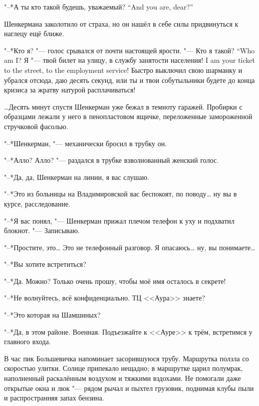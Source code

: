 {"--*А ты кто такой будешь, уважаемый?}
{``And you are, dear?''}

Шенкермана заколотило от страха, но он нашёл в себе силы придвинуться к наглецу ещё ближе.

"--*Кто я? "--- голос срывался от почти настоящей ярости.
{"--- Кто я такой?}
{``Who am I?}
{Я "--- твой билет на улицу, в службу занятости населения!}
{I am your ticket to the street, to the employment service!}
Быстро выключил свою шарманку и убрался отсюда, даю десять секунд, или ты и твои собутыльники будете до конца кризиса за жратву натурой расплачиваться!

\ldots{}Десять минут спустя Шенкерман уже бежал в темноту гаражей.
Пробирки с образцами лежали у него в пенопластовом ящичке, переложенные замороженной стручковой фасолью.

\asterism

\textspace

\label{Wed_2012_08_29}

"--*Шенкерман, "--- механически бросил в трубку он.

"--*Алло? Алло? "--- раздался в трубке взволнованный женский голос.

"--*Да, да, Шенкерман на линии, я вас слушаю.

"--*Это из больницы на Владимировской вас беспокоят, по поводу\ldots{} ну вы в курсе, расследование.

"--*Я вас понял, "--- Шенкерман прижал плечом телефон к уху и подхватил блокнот.
"--- Записываю.

"--*Простите, это\ldots{}
Это не телефонный разговор.
Я опасаюсь\ldots{} ну, вы понимаете\ldots{}

"--*Вы хотите встретиться?

"--*Да.
Можно?
Только очень прошу, чтобы моё имя осталось в секрете!

"--*Не волнуйтесь, всё конфиденциально.
ТЦ <<Аура>> знаете?

"--*Это которая на Шамшиных?

"--*Да, в этом районе.
Военная.
Подъезжайте к <<Ауре>> к трём, встретимся у главного входа.

\asterism

В час пик Большевичка напоминает засорившуюся трубу.
Маршрутка ползла со скоростью улитки.
Солнце припекало нещадно;
в маршрутке царил полумрак, наполненный раскалённым воздухом и тяжкими вздохами.
Не помогали даже открытые окна и люк "--- рядом рычал и пыхтел грузовик, поднимая клубы пыли и распространняя запах бензина.

